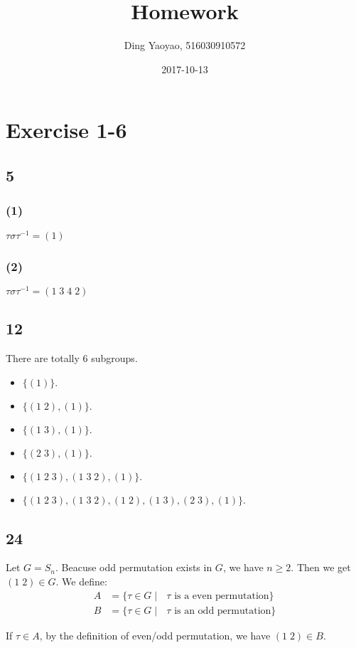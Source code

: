 \documentclass{article}
\title{Homework}
\date{2017-10-13}
\author{Ding Yaoyao, 516030910572}
\begin{document}
	\maketitle

	\section*{Exercise 1-6}
		\subsection*{5}
			\subsubsection*{(1)}
				$\tau \sigma \tau^{-1} = (1)$
			\subsubsection*{(2)}
				$\tau \sigma \tau^{-1} = (1 \; 3 \; 4 \; 2)$
		\subsection*{12}
			There are totally 6 subgroups.
			\begin{itemize}
				\item $\{(1)\}$.
				\item $\{(1 \; 2), (1)\}.$
				\item $\{(1 \; 3), (1)\}.$
				\item $\{(2 \; 3), (1)\}.$
				\item $\{(1 \; 2 \; 3), (1 \; 3 \; 2), (1)\}.$
				\item $\{(1 \; 2 \; 3), (1 \; 3 \; 2), (1 \; 2), (1 \; 3), (2 \; 3), (1)\}.$
			\end{itemize}
		\subsection*{24}
			Let $G = S_n$. Beacuse odd permutation exists in $G$, we have $n \geq 2$.
			Then we get $(1 \; 2) \in G$. We define:
			\begin{align*}
				A & = \{ \tau \in G \mid \text{ $\tau$ is a even permutation} \} \\
				B & = \{ \tau \in G \mid \text{ $\tau$ is an odd permutation} \} 
			\end{align*}

			If $\tau \in A$, by the definition of even/odd permutation, we have $(1 \;
			2) \in B$.
\end{document}
